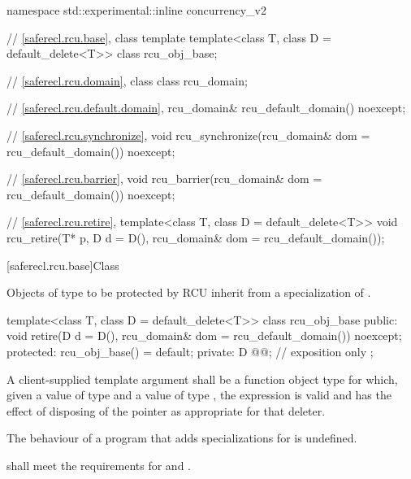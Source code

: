 \begin{codeblock}
namespace std::experimental::inline concurrency_v2 {
  // \ref{saferecl.rcu.base}, class template 
  template<class T, class D = default_delete<T>>
    class rcu_obj_base;

  // \ref{saferecl.rcu.domain}, class 
  class rcu_domain;

  // \ref{saferecl.rcu.default.domain}, 
  rcu_domain& rcu_default_domain() noexcept;

  // \ref{saferecl.rcu.synchronize}, 
  void rcu_synchronize(rcu_domain& dom = rcu_default_domain()) noexcept;

  // \ref{saferecl.rcu.barrier}, 
  void rcu_barrier(rcu_domain& dom = rcu_default_domain()) noexcept;

  // \ref{saferecl.rcu.retire}, 
  template<class T, class D = default_delete<T>>
    void rcu_retire(T* p, D d = D(), rcu_domain& dom = rcu_default_domain());
}
\end{codeblock}

[saferecl.rcu.base]{Class }


Objects of type  to be protected by RCU inherit from a
specialization of .


\begin{codeblock}
template<class T, class D = default_delete<T>>
class rcu_obj_base {
public:
  void retire(D d = D(), rcu_domain& dom = rcu_default_domain()) noexcept;
protected:
  rcu_obj_base() = default;
private:
  D @@;            // exposition only
};
\end{codeblock}

\pnum
A client-supplied template argument  shall be a
function object type  for which,
given a value  of type  and a value 
of type , the expression  is valid and
has the effect of disposing of the pointer as appropriate for
that deleter.

\pnum
The behaviour of a program that adds specializations for
 is undefined.

\pnum
{} shall meet the requirements for
 and .


